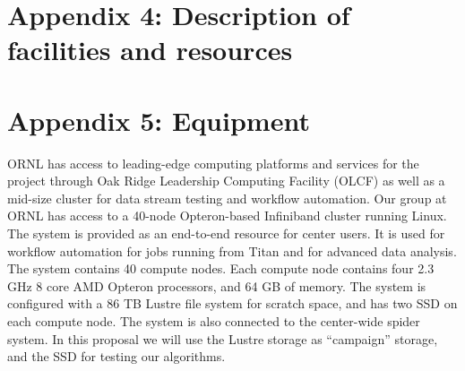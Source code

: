 \documentclass[11pt,titlepage]{report}
\begin{document}
{\section*{Appendix 4: Description of facilities and resources}

 
\clearpage
\markboth{}{}
{}
\section*{Appendix 5: Equipment}

\vspace{2ex}
\noindent
ORNL has access to leading-edge computing platforms and services for the project through Oak Ridge Leadership Computing Facility (OLCF) as well as a mid-size cluster for data stream testing and workflow automation.
Our group at ORNL has access to a 40-node Opteron-based Infiniband cluster running Linux. The system is provided as an end-to-end resource for center users. It is used for workflow automation for jobs running from Titan and for advanced data analysis. The system contains 40 compute nodes. Each compute node contains four 2.3 GHz 8 core AMD Opteron processors, and 64 GB of memory. The system is configured with a 86 TB Lustre file system for scratch space, and has two SSD on each compute node.
The system is also connected to the center-wide spider system. In this proposal we will use the Lustre storage as ``campaign''
storage, and the SSD for testing our algorithms.

\clearpage
\markboth{}{}




%
%
%
%
%
%
%
%
%
%
%
%
%
%
%
%
%   

}
\end{document}

